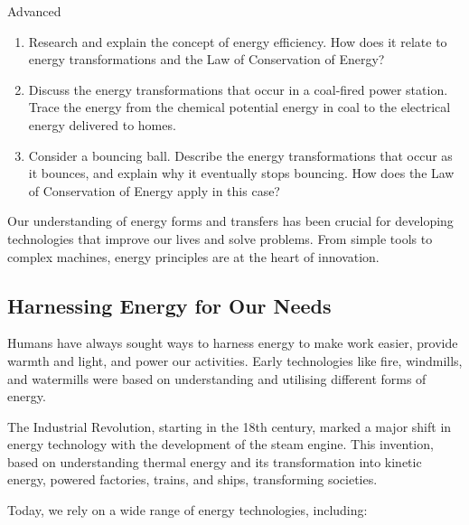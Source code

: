 \begin{marginnote}
\begin{tieredquestions}{Advanced}
\begin{enumerate}
    \item Research and explain the concept of energy efficiency. How does it relate to energy transformations and the Law of Conservation of Energy?
    \item Discuss the energy transformations that occur in a coal-fired power station.  Trace the energy from the chemical potential energy in coal to the electrical energy delivered to homes.
    \item Consider a bouncing ball.  Describe the energy transformations that occur as it bounces, and explain why it eventually stops bouncing.  How does the Law of Conservation of Energy apply in this case?
\end{enumerate}
\end{tieredquestions}


\FloatBarrier

Our understanding of energy forms and transfers has been crucial for developing technologies that improve our lives and solve problems.  From simple tools to complex machines, energy principles are at the heart of innovation.

\subsection{Harnessing Energy for Our Needs}

Humans have always sought ways to harness energy to make work easier, provide warmth and light, and power our activities.  Early technologies like fire, windmills, and watermills were based on understanding and utilising different forms of energy.


The Industrial Revolution, starting in the 18th century, marked a major shift in energy technology with the development of the steam engine.  This invention, based on understanding thermal energy and its transformation into kinetic energy, powered factories, trains, and ships, transforming societies.

Today, we rely on a wide range of energy technologies, including:


\end{marginnote}
